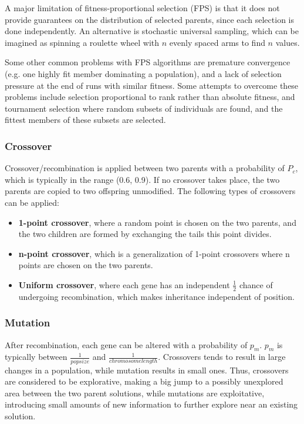 \documentclass[12pt,titlepage]{article}
\begin{document}
        A major limitation of fitness-proportional selection (FPS) is that it does not provide guarantees on the distribution of selected parents, since each selection is done
        independently. An alternative is stochastic universal sampling, which can be imagined as spinning a roulette wheel with $n$ evenly spaced arms to find $n$ values.

        Some other common problems with FPS algorithms are premature convergence (e.g. one highly fit member dominating a population), and a lack of selection pressure at the end
        of runs with similar fitness. Some attempts to overcome these problems include selection proportional to rank rather than absolute fitness, and tournament selection where
        random subsets of individuals are found, and the fittest members of these subsets are selected.

      \subsubsection{Crossover}
        Crossover/recombination is applied between two parents with a probability of $P_c$, which is typically in the range (0.6, 0.9). If no crossover takes place, the two parents
        are copied to two offspring unmodified. The following types of crossovers can be applied:
        \begin{itemize}
          \item \textbf{1-point crossover}, where a random point is chosen on the two parents, and the two children are formed by exchanging the tails this point divides.
          \item \textbf{n-point crossover}, which is a generalization of 1-point crossovers where n points are chosen on the two parents.
          \item \textbf{Uniform crossover}, where each gene has an independent $\frac{1}{2}$ chance of undergoing recombination, which makes inheritance independent of position.
        \end{itemize}

      \subsubsection{Mutation}
        After recombination, each gene can be altered with a probability of $p_m$. $p_m$ is typically between $\frac{1}{popsize}$ and $\frac{1}{chromosomelength}$. Crossovers
        tends to result in large changes in a population, while mutation results in small ones. Thus, crossovers are considered to be explorative, making a big jump to a
        possibly unexplored area between the two parent solutions, while mutations are exploitative, introducing small amounts of new information to further explore near an
        existing solution.
\end{document}
